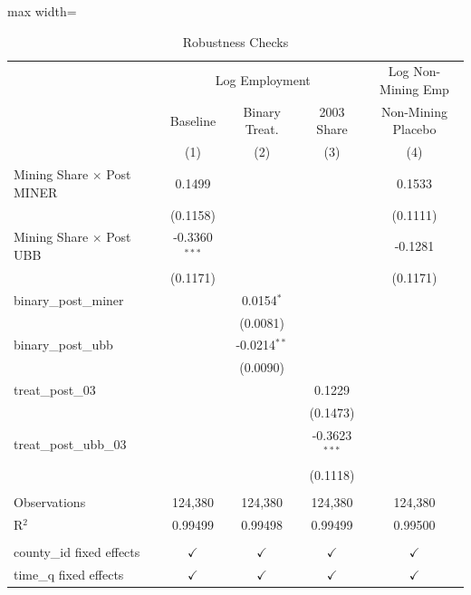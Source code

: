 \begin{table}[htbp]
   \caption{\label{tab:robustness} Robustness Checks}
   \bigskip
   \centering
   \begin{adjustbox}{max width=\textwidth}
   \begin{tabular}{lcccc}
      \toprule
       & \multicolumn{3}{c}{Log Employment} & Log Non-Mining Emp\\
                                        & Baseline        & Binary Treat.  & 2003 Share      & Non-Mining Placebo \\   
                                        & (1)             & (2)            & (3)             & (4)\\  
      \midrule 
      Mining Share $\times$ Post MINER  & 0.1499          &                &                 & 0.1533\\   
                                        & (0.1158)        &                &                 & (0.1111)\\   
      Mining Share $\times$ Post UBB    & -0.3360$^{***}$ &                &                 & -0.1281\\   
                                        & (0.1171)        &                &                 & (0.1171)\\   
      binary\_post\_miner               &                 & 0.0154$^{*}$   &                 &   \\   
                                        &                 & (0.0081)       &                 &   \\   
      binary\_post\_ubb                 &                 & -0.0214$^{**}$ &                 &   \\   
                                        &                 & (0.0090)       &                 &   \\   
      treat\_post\_03                   &                 &                & 0.1229          &   \\   
                                        &                 &                & (0.1473)        &   \\   
      treat\_post\_ubb\_03              &                 &                & -0.3623$^{***}$ &   \\   
                                        &                 &                & (0.1118)        &   \\   
       \\
      Observations                      & 124,380         & 124,380        & 124,380         & 124,380\\  
      R$^2$                             & 0.99499         & 0.99498        & 0.99499         & 0.99500\\  
       \\
      county\_id fixed effects          & $\checkmark$    & $\checkmark$   & $\checkmark$    & $\checkmark$\\   
      time\_q fixed effects             & $\checkmark$    & $\checkmark$   & $\checkmark$    & $\checkmark$\\   
      \bottomrule
   \end{tabular}
   \end{adjustbox}


\end{table}
